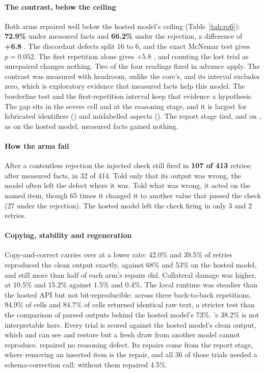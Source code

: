 \paragraph{The contrast, below the ceiling}
Both arms repaired well below the hosted model's ceiling
(Table~\ref{tab:rq6}): \textbf{72.9\%}  under measured facts and
\textbf{66.2\%}  under the rejection, a difference of
\textbf{+6.8\pp{} }. The discordant defects split 16 to 6, and
the exact McNemar test gives $p=0.052$. The first repetition alone gives
+5.8\pp{} , and counting the lost trial as unrepaired changes
nothing. Two of the four readings fixed in advance apply. The contrast was
measured with headroom, unlike the core's, and its interval excludes zero,
which is exploratory evidence that measured facts help this model. The
borderline test and the first-repetition interval keep that evidence a
hypothesis. The gap sits in the severe cell and at the reasoning stage, and it
is largest for fabricated identifiers () and mislabelled aspects
(). The report stage tied, and on , as on the hosted model,
measured facts gained nothing.

\paragraph{How the arms fail}
After a contentless rejection the injected check still fired in \textbf{107 of
413} retries; after measured facts, in 32 of 414. Told only that its output
was wrong, the model often left the defect where it was. Told what was wrong,
it acted on the named item, though 65 times it changed it to another value that
passed the check (27 under the rejection). The hosted model left the check
firing in only 3 and 2 retries.

\paragraph{Copying, stability and regeneration}
Copy-and-correct carries over at a lower rate: 42.0\% and 39.5\% of retries
reproduced the clean output exactly, against 68\% and 53\% on the hosted model,
and still more than half of each arm's repairs did. Collateral damage was
higher, at 10.5\% and 15.2\% against 1.5\% and 0.4\%. The local runtime was
steadier than the hosted API but not bit-reproducible: across three
back-to-back repetitions, 94.9\% of  cells and 84.7\% of  cells
returned identical raw text, a stricter test than the comparison of parsed
outputs behind the hosted model's 73\%. 's 38.2\%  is
not interpretable here. Every trial is scored against the hosted model's clean
output, which  and  can see and restore but a fresh draw from
another model cannot reproduce.  repaired no reasoning defect. Its
repairs come from the report stage, where removing an inserted item is the
repair, and all 36 of those trials needed a schema-correction call; without
them  repaired 4.5\%.

